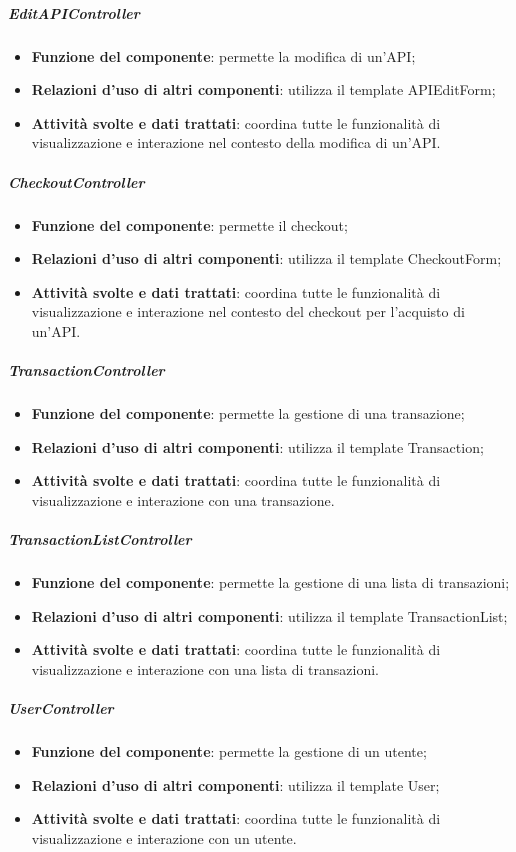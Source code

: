 \subparagraph{EditAPIController}
\begin{itemize}
	\item \textbf{Funzione del componente}: permette la modifica di un'API;
	\item \textbf{Relazioni d’uso di altri componenti}: utilizza il template APIEditForm;
	\item \textbf{Attività svolte e dati trattati}: coordina tutte le funzionalità di visualizzazione e interazione nel contesto della modifica di un'API.
\end{itemize}

\subparagraph{CheckoutController}
\begin{itemize}
	\item \textbf{Funzione del componente}: permette il checkout;
	\item \textbf{Relazioni d’uso di altri componenti}: utilizza il template CheckoutForm;
	\item \textbf{Attività svolte e dati trattati}: coordina tutte le funzionalità di visualizzazione e interazione nel contesto del checkout per l'acquisto di un'API.
\end{itemize}

\subparagraph{TransactionController}
\begin{itemize}
	\item \textbf{Funzione del componente}: permette la gestione di una transazione;
	\item \textbf{Relazioni d’uso di altri componenti}: utilizza il template Transaction;
	\item \textbf{Attività svolte e dati trattati}: coordina tutte le funzionalità di visualizzazione e interazione con una transazione.
\end{itemize}

\subparagraph{TransactionListController}
\begin{itemize}
	\item \textbf{Funzione del componente}: permette la gestione di una lista di transazioni;
	\item \textbf{Relazioni d’uso di altri componenti}: utilizza il template TransactionList;
	\item \textbf{Attività svolte e dati trattati}: coordina tutte le funzionalità di visualizzazione e interazione con una lista di transazioni.
\end{itemize}

\subparagraph{UserController}
\begin{itemize}
	\item \textbf{Funzione del componente}: permette la gestione di un utente;
	\item \textbf{Relazioni d’uso di altri componenti}: utilizza il template User;
	\item \textbf{Attività svolte e dati trattati}: coordina tutte le funzionalità di visualizzazione e interazione con un utente.
\end{itemize}

